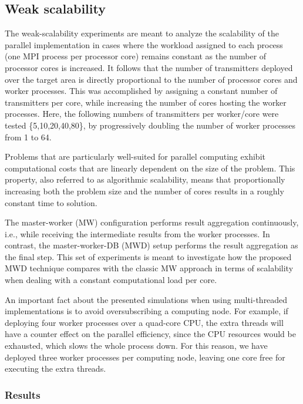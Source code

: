 \subsection{Weak scalability}

The weak-scalability experiments are meant to analyze the scalability
of the parallel implementation in cases where the workload assigned
to each process (one MPI process per processor core) remains constant
as the number of processor cores is increased. It follows that the
number of transmitters deployed over the target area is directly proportional
to the number of processor cores and worker processes. This was accomplished
by assigning a constant number of transmitters per core, while increasing
the number of cores hosting the worker processes. Here, the following
numbers of transmitters per worker/core were tested \{5,10,20,40,80\},
by progressively doubling the number of worker processes from 1 to
64.

Problems that are particularly well-suited for parallel computing
exhibit computational costs that are linearly dependent on the size
of the problem. This property, also referred to as algorithmic scalability,
means that proportionally increasing both the problem size and the
number of cores results in a roughly constant time to solution.

The master-worker (MW)
configuration performs result aggregation continuously, i.e., while
receiving the intermediate results from the worker processes. In contrast,
the master-worker-DB (MWD)
setup performs the result aggregation as the final step. This set
of experiments is meant to investigate how the proposed MWD technique
compares with the classic MW approach in terms of scalability when
dealing with a constant computational load per core.

An important fact about the presented simulations when using multi-threaded
implementations is to avoid oversubscribing a computing node. For
example, if deploying four worker processes over a quad-core CPU,
the extra threads will have a counter effect on the parallel efficiency,
since the CPU resources would be exhausted, which slows the whole
process down. For this reason, we have deployed three worker processes
per computing node, leaving one core free for executing the extra
threads. 


\subsubsection{Results}

